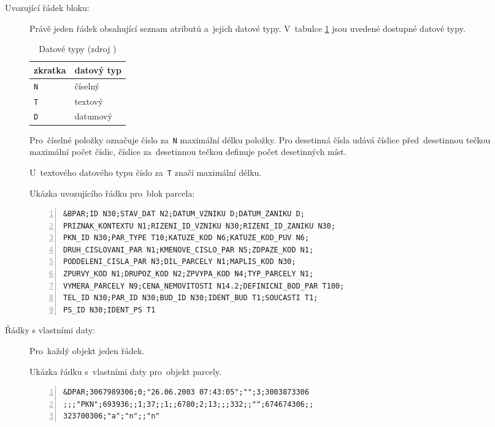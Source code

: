 \begin{description}	
	\item[Uvozující řádek bloku:] Právě jeden řádek obsahující seznam atributů a~jejich datové typy. V~tabulce \ref{tab:datove_typy} jsou uvedené dostupné datové typy.

		\begin{table}[H]
		\begin{tabular}{|l|l|}
		\hline
		 zkratka & datový typ \\
		\hline
		\hline
		 \texttt{N} & číselný \\ \hline
		 \texttt{T} & textový \\ \hline
		 \texttt{D} & datumový \\
		 \hline
		\end{tabular}
		 \centering
		  \caption[Datové typy]{Datové typy (zdroj \citep{struktura_vfk})}
		  \label{tab:datove_typy}
		\end{table}

Pro~číselné položky označuje číslo za~\texttt{N} maximální délku položky. Pro desetinná čísla udává číslice před~desetinnou tečkou maximální počet číslic, číslice za~desetinnou tečkou definuje počet desetinných míst.

U~textového datového typu číslo za~\texttt{T} značí maximální délku.

Ukázka uvozujícího řádku pro~blok parcela:

	\begin{lstlisting}[basicstyle=\footnotesize\ttfamily, backgroundcolor = \color{light-gray},  numbers=left]
&BPAR;ID N30;STAV_DAT N2;DATUM_VZNIKU D;DATUM_ZANIKU D;
PRIZNAK_KONTEXTU N1;RIZENI_ID_VZNIKU N30;RIZENI_ID_ZANIKU N30;
PKN_ID N30;PAR_TYPE T10;KATUZE_KOD N6;KATUZE_KOD_PUV N6;
DRUH_CISLOVANI_PAR N1;KMENOVE_CISLO_PAR N5;ZDPAZE_KOD N1;
PODDELENI_CISLA_PAR N3;DIL_PARCELY N1;MAPLIS_KOD N30;
ZPURVY_KOD N1;DRUPOZ_KOD N2;ZPVYPA_KOD N4;TYP_PARCELY N1;
VYMERA_PARCELY N9;CENA_NEMOVITOSTI N14.2;DEFINICNI_BOD_PAR T100;
TEL_ID N30;PAR_ID N30;BUD_ID N30;IDENT_BUD T1;SOUCASTI T1;
PS_ID N30;IDENT_PS T1
	\end{lstlisting}

	\item[Řádky s vlastními daty:] Pro~každý objekt jeden řádek.

Ukázka řádku s~vlastními daty pro~objekt parcely.
	
	\begin{lstlisting}[basicstyle=\footnotesize\ttfamily, backgroundcolor = \color{light-gray},  numbers=left]
&DPAR;3067989306;0;"26.06.2003 07:43:05";"";3;3003873306
;;;"PKN";693936;;1;37;;1;;6780;2;13;;;332;;"";674674306;;
323700306;"a";"n";;"n"
	\end{lstlisting}
\end{description}

